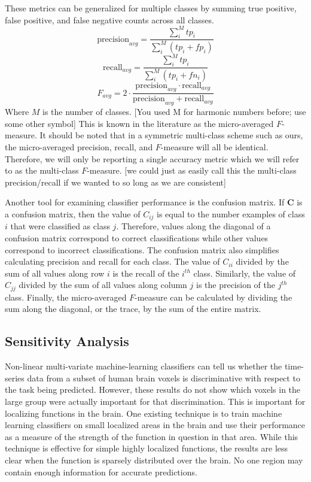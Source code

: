 \documentclass[preprint,authoryear,12pt]{elsarticle}
\begin{document}
These metrics can be generalized for multiple classes by summing true positive, false positive, and false negative counts across all classes.
\begin{equation}
\mbox{precision}_{avg} =\frac{\sum_{i}^{M}{tp_{i}}}{\sum_{i}^{M}{\left( tp_{i} + fp_{i} \right)}}
\end{equation}
\begin{equation}
\mbox{recall}_{avg} = \frac{\sum_{i}^{M}{tp_{i}}}{\sum_{i}^{M}{\left( tp_{i} + fn_{i} \right)}}
\end{equation}
\begin{equation}
F_{avg} = 2 \cdot \frac{\mbox{precision}_{avg} \cdot \mbox{recall}_{avg}}{\mbox{precision}_{avg} + \mbox{recall}_{avg}}
\end{equation}
Where $M$ is the number of classes. [You used M for harmonic numbers before; use some other symbol]
This is known in the literature as the  micro-averaged $F$-measure.
It should be noted that in a symmetric multi-class scheme such as ours, the micro-averaged precision, recall, and $F$-measure will all be identical. 
Therefore, we will only be reporting a single accuracy metric which we will refer to as the multi-class $F$-measure. 
[we could just as easily call this the multi-class precision/recall if we wanted to so long as we are consistent]

Another tool for examining classifier performance is the confusion matrix.
If $\mathbf{C}$ is a confusion matrix, then the value of $C_{ij}$ is equal to the number examples of class $i$ that were classified as class $j$.
Therefore, values along the diagonal of a confusion matrix correspond to correct classifications while other values correspond to incorrect classifications.
The confusion matrix also simplifies calculating precision and recall for each class.
The value of $C_{ii}$ divided by the sum of all values along row $i$ is the recall of the $i^{th}$ class.
Similarly, the value of $C_{jj}$ divided by the sum of all values along column $j$ is the precision of the $j^{th}$ class.
Finally, the micro-averaged $F$-measure can be calculated by dividing the sum along the diagonal, or the trace, by the sum of the entire matrix.

\subsection{Sensitivity Analysis}
Non-linear multi-variate machine-learning classifiers can tell us whether the time-series data from a subset of human brain voxels is discriminative with respect to the task being predicted. 
However, these results do not show which voxels in the large group were actually important for that discrimination.
This is important for localizing functions in the brain.
One existing technique is to train machine learning classifiers on small localized areas in the brain and use their performance as a measure of the strength of the function in question in that area.
While this technique is effective for simple highly localized functions, the results are less clear when the function is sparsely distributed over the brain.
No one region may contain enough information for accurate predictions.
\end{document}
